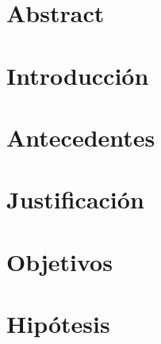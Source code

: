 \documentclass[11pt, letterpaper, twoside, openright]{report}
\newcommand{\defaultparformat}[1]{
	{\setlength{\parskip}{2ex}
     }
}
\begin{document}
	\chapter*{Abstract}
	\ifdefined\parpordefecto
		\defaultparformat{c-abstract}
	\else
		
	\fi
\fi

\ifdefined\CAPintroduccion
	\newpage
	\cleardoublepage
	\setcounter{page}{1}
	\chapter{Introducción}
	\ifdefined\parpordefecto
		\defaultparformat{d-introduccion}
	\else
		
	\fi
\fi

\ifdefined\CAPantecedentes
	\newpage
	\chapter{Antecedentes}
	\ifdefined\parpordefecto
    	\defaultparformat{e-antecedentes}
    \else
    	
    \fi  
\fi

\ifdefined\CAPjustificacion
	\newpage
	\chapter{Justificación}
	\ifdefined\parpordefecto
		\defaultparformat{f-justificacion}
	\else
		
	\fi
\fi

\ifdefined\CAPobjetivos
	\newpage
	\chapter{Objetivos}
	\ifdefined\parpordefecto
		\defaultparformat{g-objetivos}
	\else
		
	\fi
\fi

\ifdefined\CAPhipotesis
	\newpage
	\chapter{Hipótesis}
	\ifdefined\parpordefecto
		\defaultparformat{r-hipotesis}
	\else
		
	\fi
\fi
\end{document}
